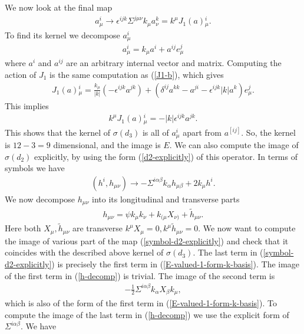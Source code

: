 \documentclass[10pt]{report}
\theoremstyle{definition}
\begin{document}
We now look at the final map
\begin{align}
a^i_\mu \to \epsilon^{ijk} \Sigma^{j\mu\nu} k_\mu a^k_\nu = k^\mu J_1(a){}^i_\mu.
\end{align}
To find its kernel we decompose $a^i_\mu$
\begin{align}\label{E-valued-1-form-k-basis}
a^i_\mu = k_\mu a^i + a^{ij} e^j_\mu
\end{align}
where $a^i$ and $a^{ij}$ are an arbitrary internal vector and matrix.
Computing the action of $J_1$ is the same computation as (\ref{J1-b}), which gives
\begin{align}
J_1(a){}^i_\mu =  \frac{k_\mu}{|k|}( - \epsilon^{ijk} a^{jk}) + \left( \delta^{ij} a^{kk} - a^{ji} - \epsilon^{ijk}|k| a^k \right) e^j_\mu.
\end{align}
This implies
\begin{align}
k^\mu J_1(a){}^i_\mu = - |k| \epsilon^{ijk} a^{jk}.
\end{align}
This shows that the kernel of $\sigma(d_3)$ is all of $a^i_\mu$ apart from $a^{[ij]}$. So, the kernel is $12-3=9$ dimensional, and the image is $E$. We can also compute the image of $\sigma(d_2)$ explicitly, by using the form (\ref{d2-explicitly}) of this operator. In terms of symbols we have
\begin{align}\label{symbol-d2-explicitly}
(h^i , h_{\mu\nu}) \to - \Sigma^{i\alpha\beta} k_\alpha h_{\mu\beta} + 2 k_\mu h^i.
\end{align}
We now decompose $h_{\mu\nu}$ into its longitudinal and transverse parts
\begin{align}\label{h-decomp}
h_{\mu\nu} = \psi k_\mu k_\nu + k_{(\mu} X_{\nu)} + \tilde{h}_{\mu\nu}.
\end{align}
Here both $X_\mu, \tilde{h}_{\mu\nu}$ are transverse $k^\mu X_\mu=0, k^\mu \tilde{h}_{\mu\nu}=0$. We now want to compute the image of various part of the map (\ref{symbol-d2-explicitly}) and check that it coincides with the described above kernel of $\sigma(d_3)$. The last term in (\ref{symbol-d2-explicitly}) is precisely the first term in (\ref{E-valued-1-form-k-basis}). The image of the first term in (\ref{h-decomp}) is trivial. The image of the second term is
\begin{align}
- \frac{1}{2} \Sigma^{i\alpha\beta} k_\alpha X_\beta k_\mu,
\end{align}
which is also of the form of the first term in (\ref{E-valued-1-form-k-basis}). To compute the image of the last term in (\ref{h-decomp}) we use the explicit form of $\Sigma^{i\alpha\beta}$. We have
\end{document}
